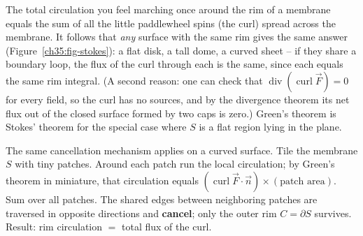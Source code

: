 \begin{intuitionbox}
The total circulation you feel marching once around the rim of a membrane equals
the sum of all the little paddlewheel spins (the curl) spread across the membrane.
It follows that \emph{any} surface with the same rim gives the same answer
(Figure~\ref{ch35:fig-stokes}): a flat disk, a tall dome, a curved sheet -- if they
share a boundary loop, the flux of the curl through each is the same, since each
equals the same rim integral. (A second reason: one can check that
$\operatorname{div}(\operatorname{curl}\vec F)=0$ for every field, so the curl has
no sources, and by the divergence theorem its net flux out of the closed surface
formed by two caps is zero.) Green's theorem is Stokes' theorem for the special
case where $S$ is a flat region lying in the plane.
\end{intuitionbox}

\begin{happeningbox}
The same cancellation mechanism applies on a curved surface. Tile the membrane $S$ with tiny patches. Around each
patch run the local circulation; by Green's theorem in miniature, that circulation
equals $(\operatorname{curl}\vec F\cdot\vec n)\times(\text{patch area})$.
Sum over all patches. The shared edges between neighboring patches are traversed in
opposite directions and \textbf{cancel}; only the outer rim $C=\partial S$ survives.
Result: rim circulation $=$ total flux of the curl.
\end{happeningbox}

